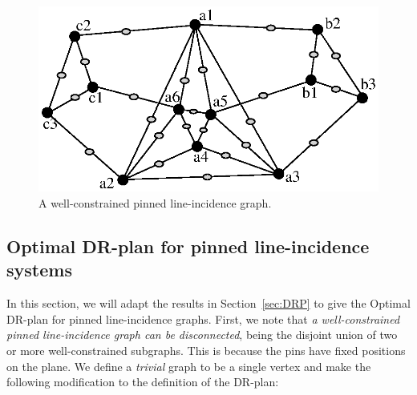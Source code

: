 \begin{figure}
  \centering
   \includegraphics[width=.8\linewidth]{img/pinned}
\caption{ A well-constrained pinned line-incidence graph.}
\label{fig:pinned_line}
\end{figure}


\subsection{Optimal DR-plan for pinned line-incidence systems}


In this section, we will adapt the results in Section~\ref{sec:DRP}
to give the Optimal DR-plan for pinned line-incidence graphs.
First, we note that %
{\em a well-constrained pinned line-incidence graph can be disconnected},
being the disjoint union of two or more well-constrained subgraphs. 
This is because the pins have fixed positions on the plane.
%
%
%
%
%
%
%
We define a {\em trivial} graph to be a single vertex and make the following modification to the definition of the DR-plan:


